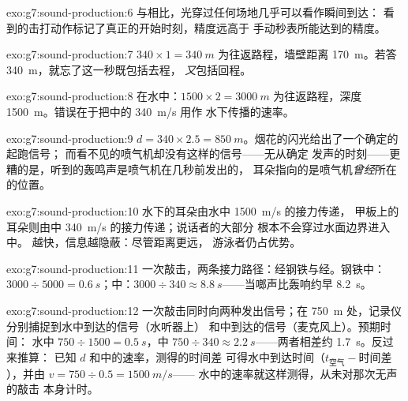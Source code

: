 \begin{solution}{exo:g7:sound-production:6}
与相比，光穿过任何场地几乎可以看作瞬间到达：
看到的击打动作标记了真正的开始时刻，精度远高于
手动秒表所能达到的精度。
\end{solution}

\begin{solution}{exo:g7:sound-production:7}
$340 \times 1 = \qty{340}{m}$ 为往返路程，墙壁距离
\qty{170}{m}。若答 \qty{340}{m}，就忘了这一秒既包括去程，
\emph{又}包括回程。
\end{solution}

\begin{solution}{exo:g7:sound-production:8}
在水中：$1500 \times 2 = \qty{3000}{m}$ 为往返路程，深度
\qty{1500}{m}。错误在于把中的 \qty{340}{m/s} 用作
水下传播的速率。
\end{solution}

\begin{solution}{exo:g7:sound-production:9}
$d = 340 \times 2.5 = \qty{850}{m}$。烟花的闪光给出了一个确定的起跑信号；
而看不见的喷气机却没有这样的信号——无从确定
发声的时刻——更糟的是，听到的轰鸣声是喷气机在几秒前发出的，
耳朵指向的是喷气机\emph{曾经}所在的位置。
\end{solution}

\begin{solution}{exo:g7:sound-production:10}
水下的耳朵由水中 \qty{1500}{m/s} 的接力传递，
甲板上的耳朵则由中 \qty{340}{m/s} 的接力传递；说话者的大部分
根本不会穿过水面边界进入中。
越快，信息越隐蔽：尽管距离更远，
游泳者仍占优势。
\end{solution}

\begin{solution}{exo:g7:sound-production:11}
一次敲击，两条接力路径：经钢铁与经。钢铁中：
$3000 \div 5000 = \qty{0.6}{s}$；中：$3000 \div 340 \approx
\qty{8.8}{s}$——当啷声比轰响约早
\qty{8.2}{s}。
\end{solution}

\begin{solution}{exo:g7:sound-production:12}
一次敲击同时向两种发出信号；在
\qty{750}{m} 处，记录仪分别捕捉到水中到达的信号（水听器上）
和中到达的信号（麦克风上）。预期时间：
水中 $750 \div 1500 = \qty{0.5}{s}$，中 $750 \div 340
\approx \qty{2.2}{s}$——两者相差约 \qty{1.7}{s}。反过来推算：
已知 $d$ 和中的速率，测得的时间差
可得水中到达时间（$t_{\text{空气}} -
\text{时间差}$），并由 $v = 750 \div 0.5 = \qty{1500}{m/s}$——
水中的速率就这样测得，从未对那次无声的敲击
本身计时。
\end{solution}

